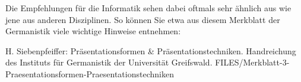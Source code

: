 Die Empfehlungen für die Informatik sehen dabei oftmals sehr ähnlich aus wie jene aus anderen Disziplinen.
So können Sie etwa aus diesem Merkblatt der Germanistik viele wichtige Hinweise entnehmen:

{H. Siebenpfeiffer: Präsenta\-tions\-formen \& Präsentationstechniken.
Handreichung des Instituts für Germanistik der Universität Greifswald.}
{FILES/Merkblatt-3-Praesentationsformen-Praesentationstechniken}
{\href{https://germanistik.uni-greifswald.de/storages/uni-greifswald/fakultaet/phil/germanistik/Mitarbeitende/Siebenpfeiffer/Merkblatt__3_Praesentationsformen___Praesentationstechniken.pdf}{\online}}

